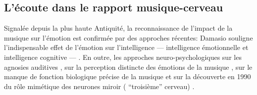 \subsection{ L'écoute dans le rapport musique-cerveau}
Signalée depuis la plus haute Antiquité,  la reconnaissance de
l'impact de la musique sur l'émotion est confirmée par
des approches récentes: Damasio
souligne l'indispensable effet de l'émotion
sur l'intelligence   ---     intelligence émotionnelle et intelligence
  cognitive --- \autocite {damasio:lautre}.
En outre, les approches neuro-psychologiques sur les agnosies
  auditives \autocite{seron.baron.ea:neuropsychologie},
sur la perception distincte des émotions de la musique
\autocite{platel_neuropsychology_2002},
sur  
 le
manque de fonction biologique précise de la musique \autocite {bigand:cerveau}
et sur la
découverte en 1990 du rôle mimétique des neurones miroir ( ``troisième''
cerveau) \autocite{Rizzolati}.

